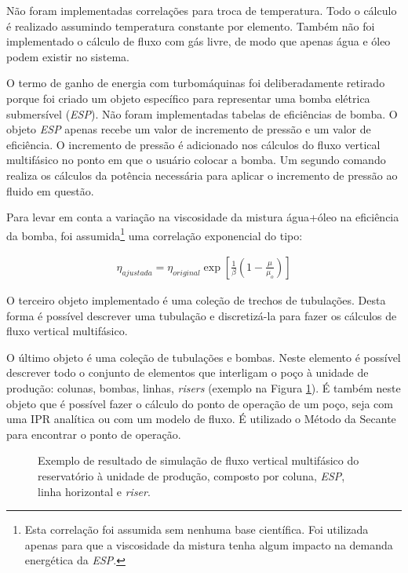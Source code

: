 \documentclass[final,5p]{elsarticle}
\numberwithin{equation}{section}
\begin{document}
        Não foram implementadas correlações para troca de temperatura. Todo o cálculo é realizado assumindo temperatura constante por elemento. Também não foi implementado o cálculo de fluxo com gás livre, de modo que apenas água e óleo podem existir no sistema.

        O termo de ganho de energia com turbomáquinas foi deliberadamente retirado porque foi criado um objeto específico para representar uma bomba elétrica submersível (\emph{ESP}). Não foram implementadas tabelas de eficiências de bomba. O objeto \emph{ESP} apenas recebe um valor de incremento de pressão e um valor de eficiência. O incremento de pressão é adicionado nos cálculos do fluxo vertical multifásico no ponto em que o usuário colocar a bomba. Um segundo comando realiza os cálculos da potência necessária para aplicar o incremento de pressão ao fluido em questão.

        Para levar em conta a variação na viscosidade da mistura água+óleo na eficiência da bomba, foi assumida\footnote{Esta correlação foi assumida sem nenhuma base científica. Foi utilizada apenas para que a viscosidade da mistura tenha algum impacto na demanda energética da \emph{ESP}.} uma correlação exponencial do tipo:

        \begin{align}
            \eta_{ajustada} = \eta_{original} \exp \left[\frac{1}{\beta}\left(1-\frac{\mu}{\mu_o}\right) \right]
        \end{align}

        O terceiro objeto implementado é uma coleção de trechos de tubulações. Desta forma é possível descrever uma tubulação e discretizá-la para fazer os cálculos de fluxo vertical multifásico.

        O último objeto é uma coleção de tubulações e bombas. Neste elemento é possível descrever todo o conjunto de elementos que interligam o poço à unidade de produção: colunas, bombas, linhas, \emph{risers} (exemplo na Figura \ref{fig:flow}). É também neste objeto que é possível fazer o cálculo do ponto de operação de um poço, seja com uma IPR analítica ou com um modelo de fluxo. É utilizado o Método da Secante para encontrar o ponto de operação.

        \begin{figure}[hbt!]
            \caption{Exemplo de resultado de simulação de fluxo vertical multifásico do reservatório à unidade de produção, composto por coluna, \emph{ESP}, linha horizontal e \emph{riser}.}
            \label{fig:flow}
        \end{figure}
\end{document}

